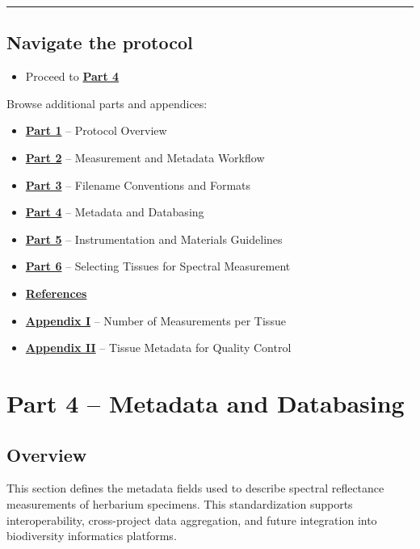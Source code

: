 \documentclass[
  letterpaper,
  DIV=11,
  numbers=noendperiod]{scrreprt}
\providecommand{\tightlist}{%
  \setlength{\itemsep}{0pt}\setlength{\parskip}{0pt}}
\begin{document}
\begin{center}\rule{0.5\linewidth}{0.5pt}\end{center}

\section{Navigate the protocol}\label{navigate-the-protocol-3}

\begin{itemize}
\tightlist
\item
  Proceed to \hyperref[part4]{\textbf{Part 4}}
\end{itemize}

Browse additional parts and appendices:

\begin{itemize}
\tightlist
\item
  \hyperref[part1]{\textbf{Part 1}} -- Protocol Overview
\item
  \hyperref[part2]{\textbf{Part 2}} -- Measurement and Metadata Workflow
\item
  \hyperref[part3]{\textbf{Part 3}} -- Filename Conventions and Formats
\item
  \hyperref[part4]{\textbf{Part 4}} -- Metadata and Databasing
\item
  \hyperref[part5]{\textbf{Part 5}} -- Instrumentation and Materials
  Guidelines
\item
  \hyperref[part6]{\textbf{Part 6}} -- Selecting Tissues for Spectral
  Measurement
\item
  \hyperref[references]{\textbf{References}}
\item
  \hyperref[app1]{\textbf{Appendix I}} -- Number of Measurements per
  Tissue
\item
  \hyperref[app2]{\textbf{Appendix II}} -- Tissue Metadata for Quality
  Control
\end{itemize}


\chapter{Part 4 -- Metadata and
Databasing}\label{part-4-metadata-and-databasing}

\section{Overview}\label{part4}

This section defines the metadata fields used to describe spectral
reflectance measurements of herbarium specimens. This standardization
supports interoperability, cross-project data aggregation, and future
integration into biodiversity informatics platforms.
\end{document}
